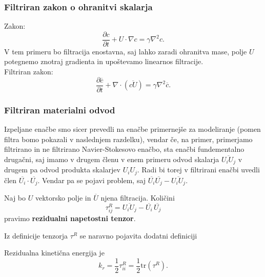 \documentclass[mat2, tisk]{fmfdelo}
\begin{document}
\subsubsection{Filtriran zakon o ohranitvi skalarja}

Zakon:
$$
\frac{\partial c}{\partial t} + U\cdot\nabla c = \gamma \nabla^2 c.
$$
V tem primeru bo filtracija enostavna, saj lahko zaradi ohranitva mase, polje $U$ 
potegnemo znotraj gradienta in upoštevamo linearnos filtracije. \\
Filtriran zakon:
\begin{equation}
\frac{\partial \overline{c}}{\partial t} + \nabla \cdot (\overline{cU}) = \gamma \nabla^2 \overline{c}.
\end{equation}

\subsubsection{Filtriran materialni odvod}

Izpeljane enačbe smo sicer prevedli na enačbe primernejše za modeliranje (pomen filtra bomo 
pokazali v naslednjem razdelku), vendar če, na primer, primerjamo filtrirano in 
ne filtrirano Navier-Stokesovo enačbo, sta enačbi fundementalno drugačni, saj imamo 
v drugem členu v enem primeru odvod skalarja $\overline{U_i U_j}$ v drugem pa odvod produkta 
skalarjev $U_i U_j$. Radi bi torej v filtrirani enačbi uvedli člen $\overline{U_i} \cdot \overline{U_j}$.
Vendar pa se pojavi problem, saj $\overline{U_i}\overline{U_j} - \overline{U_i U_j}$. 
\begin{definicija}
Naj bo $U$ vektorsko polje in $\overline{U}$ njena filtracija. Količini 
\begin{equation}
\tau_{ij}^R = \overline{U_i U_j} - \overline{U_i} \,\overline{U_j}
\end{equation}
pravimo \textbf{rezidualni napetostni tenzor}.
\end{definicija}

Iz definicije tenzorja $\tau^R$ se naravno pojavita dodatni definiciji
\begin{definicija}
Rezidualna kinetična energija je 
\begin{equation}
k_r = \frac{1}{2} \tau_{ii}^R = \frac{1}{2}\text{tr}(\tau^R).
\end{equation}
\end{definicija}
\end{document}
